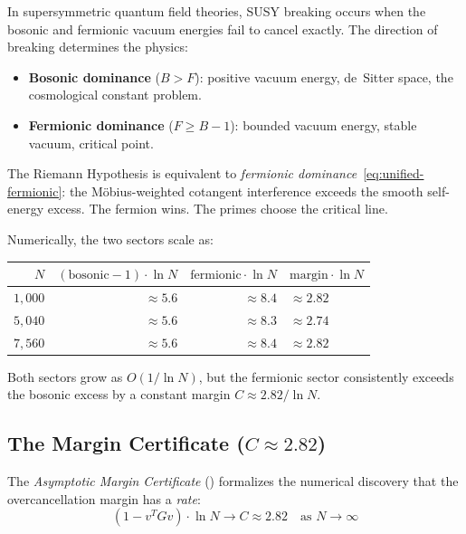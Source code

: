 \begin{correspondence}
In supersymmetric quantum field theories, SUSY breaking occurs when
the bosonic and fermionic vacuum energies fail to cancel exactly.
The direction of breaking determines the physics:
\begin{itemize}
  \item \textbf{Bosonic dominance} ($B > F$): positive vacuum energy,
    de~Sitter space, the cosmological constant problem.
  \item \textbf{Fermionic dominance} ($F \geq B - 1$): bounded vacuum
    energy, stable vacuum, critical point.
\end{itemize}
The Riemann Hypothesis is equivalent to
\emph{fermionic dominance}~\eqref{eq:unified-fermionic}: the
M\"obius-weighted cotangent interference exceeds the smooth
self-energy excess. The fermion wins. The primes choose the
critical line.

Numerically, the two sectors scale as:
\begin{center}
\small
\begin{tabular}{@{}rrrl@{}}
\toprule
$N$ & $(\text{bosonic}-1) \cdot \ln N$ & $\text{fermionic} \cdot \ln N$ & $\text{margin} \cdot \ln N$ \\
\midrule
$1{,}000$ & $\approx 5.6$ & $\approx 8.4$ & $\approx 2.82$ \\
$5{,}040$ & $\approx 5.6$ & $\approx 8.3$ & $\approx 2.74$ \\
$7{,}560$ & $\approx 5.6$ & $\approx 8.4$ & $\approx 2.82$ \\
\bottomrule
\end{tabular}
\end{center}
Both sectors grow as $O(1/\ln N)$, but the fermionic sector
consistently exceeds the bosonic excess by a constant margin
$C \approx 2.82 / \ln N$.
\end{correspondence}

\subsection{The Margin Certificate ($C \approx 2.82$)}
\label{sec:margin-certificate}

The \emph{Asymptotic Margin Certificate}
() formalizes the numerical discovery
that the overcancellation margin has a \emph{rate}:
\begin{equation}
  (1 - v^T G v) \cdot \ln N \to C \approx 2.82
  \quad\text{as } N \to \infty
  \label{eq:margin-rate}
\end{equation}

